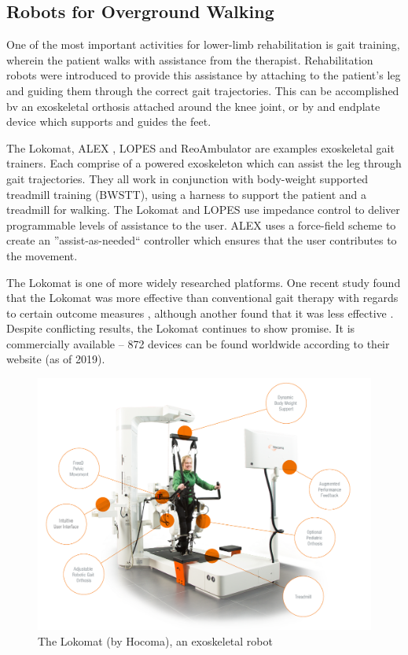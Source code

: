 \documentclass[12pt]{report}
\begin{document}
	
	\subsection{Robots for Overground Walking} \label{Sec:Overground}

	One of the most important activities for lower-limb rehabilitation is gait training, wherein the patient walks with assistance from the therapist. Rehabilitation robots were introduced to provide this assistance by attaching to the patient's leg and guiding them through the correct gait trajectories. This can be accomplished bv an exoskeletal orthosis attached around the knee joint, or by and endplate device which supports and guides the feet. 
	
	The Lokomat, ALEX \cite{Banala2007}, LOPES \cite{Veneman2007} and ReoAmbulator are examples exoskeletal gait trainers. Each comprise of a powered exoskeleton which can assist the leg through gait trajectories. They all work in conjunction with body-weight supported treadmill training (BWSTT), using a harness to support the patient and a treadmill for walking. The Lokomat and LOPES use impedance control to deliver programmable levels of assistance to the user. ALEX uses a force-field scheme to create an ''assist-as-needed`` controller which ensures that the user contributes to the movement.
	
	The Lokomat is one of more widely researched platforms. One recent study found that the Lokomat was more effective than conventional gait therapy with regards to certain outcome measures \cite{Nam2017}, although another found that it was less effective \cite{Hidler2008}. Despite conflicting results, the Lokomat continues to show promise. It is commercially available -- 872 devices can be found worldwide according to their website (as of 2019).
			
	\begin{figure}[h] 
		\centering
		\includegraphics[width=0.75\linewidth]{Lokomat}
		\caption{The Lokomat (by Hocoma), an exoskeletal robot}
		\label{fig:Lokomat}
	\end{figure}
	
\end{document}

